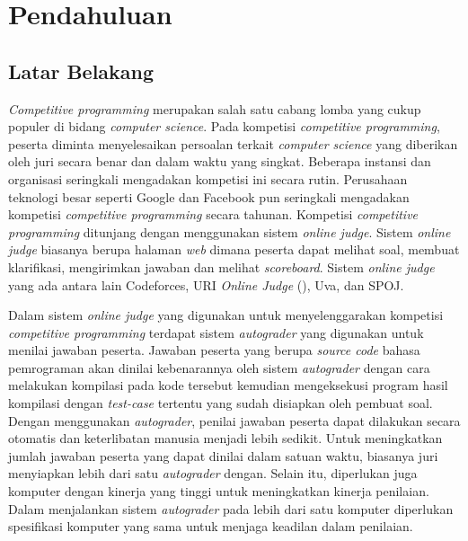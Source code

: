 \chapter{Pendahuluan}

\section{Latar Belakang}

\par \textit{Competitive programming} merupakan salah satu cabang lomba yang cukup populer di bidang \textit{computer science}. Pada kompetisi \textit{competitive programming}, peserta diminta menyelesaikan persoalan terkait \textit{computer science} yang diberikan oleh juri secara benar dan dalam waktu yang singkat. Beberapa instansi dan organisasi seringkali mengadakan kompetisi ini secara rutin. Perusahaan teknologi besar seperti Google dan Facebook pun seringkali mengadakan kompetisi \textit{competitive programming} secara tahunan. Kompetisi \textit{competitive programming} ditunjang dengan menggunakan sistem \textit{online judge}. Sistem \textit{online judge} biasanya berupa halaman \textit{web} dimana peserta dapat melihat soal, membuat klarifikasi, mengirimkan jawaban dan melihat \textit{scoreboard}. Sistem \textit{online judge} yang ada antara lain Codeforces, URI \textit{Online Judge} (\cite{uriojpaper}), Uva, dan SPOJ.

\par Dalam sistem \textit{online judge} yang digunakan untuk menyelenggarakan kompetisi \textit{competitive programming} terdapat sistem \textit{autograder} yang digunakan untuk menilai jawaban peserta. Jawaban peserta yang berupa \textit{source code} bahasa pemrograman akan dinilai kebenarannya oleh sistem \textit{autograder} dengan cara melakukan kompilasi pada kode tersebut kemudian mengeksekusi program hasil kompilasi dengan \textit{test-case} tertentu yang sudah disiapkan oleh pembuat soal. Dengan menggunakan \textit{autograder}, penilai jawaban peserta dapat dilakukan secara otomatis dan keterlibatan manusia menjadi lebih sedikit. Untuk meningkatkan jumlah jawaban peserta yang dapat dinilai dalam satuan waktu, biasanya juri menyiapkan lebih dari satu \textit{autograder} dengan. Selain itu, diperlukan juga komputer dengan kinerja yang tinggi untuk meningkatkan kinerja penilaian. Dalam menjalankan sistem \textit{autograder} pada lebih dari satu komputer diperlukan spesifikasi komputer yang sama untuk menjaga keadilan dalam penilaian.

